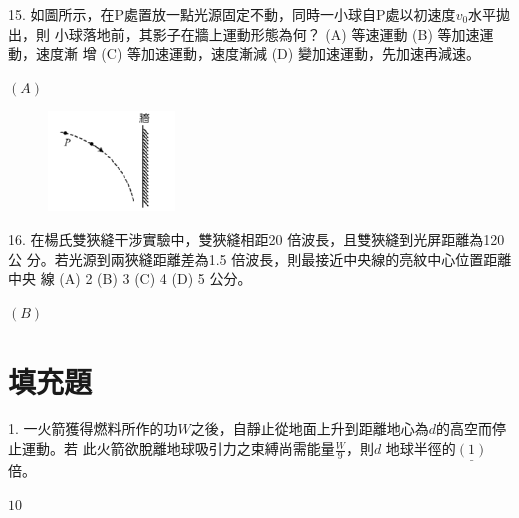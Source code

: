 \documentclass[cn,10pt,math=newtx]{elegantbook}
\begin{document}
\begin{example}
   15. 如圖所示，在P處置放一點光源固定不動，同時一小球自P處以初速度$v_0$水平拋出，則
小球落地前，其影子在牆上運動形態為何？ (A) 等速運動 (B) 等加速運動，速度漸
增 (C) 等加速運動，速度漸減 (D) 變加速運動，先加速再減速。\\
    \rightline{[全國聯招教甄109]}
\end{example}
\begin{solution}
    $(A)$
\end{solution}
\begin{figure}[htbp]
    \flushright
    \includegraphics[width=0.3\textwidth]{image/109全國15.png}
  \end{figure}
\newpage



\begin{example}
   16. 在楊氏雙狹縫干涉實驗中，雙狹縫相距20 倍波長，且雙狹縫到光屏距離為120 公
分。若光源到兩狹縫距離差為1.5 倍波長，則最接近中央線的亮紋中心位置距離中央
線 (A) 2 (B) 3 (C) 4 (D) 5 公分。\\
    \rightline{[全國聯招教甄109]}
\end{example}
\begin{solution}
    $(B)$
\end{solution}

\newpage

\section{填充題}


\begin{example}
   1. 一火箭獲得燃料所作的功$W$之後，自靜止從地面上升到距離地心為$d$的高空而停止運動。若
此火箭欲脫離地球吸引力之束縛尚需能量$\frac{W}{9}$，則$d$ 地球半徑的$\underline{(1)}$倍。\\
    \rightline{[全國聯招教甄109]}
\end{example}
\begin{solution}
    $10$
\end{solution}

\newpage
\end{document}
